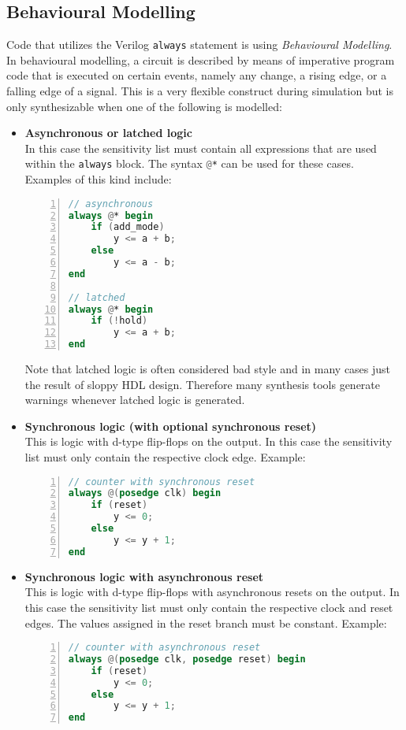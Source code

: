 \subsection{Behavioural Modelling}

Code that utilizes the Verilog {\tt always} statement is using {\it Behavioural
Modelling}. In behavioural modelling, a circuit is described by means of imperative
program code that is executed on certain events, namely any change, a rising
edge, or a falling edge of a signal. This is a very flexible construct during
simulation but is only synthesizable when one of the following is modelled:

\begin{itemize}
\item {\bf Asynchronous or latched logic} \\
In this case the sensitivity list must contain all expressions that are used within
the {\tt always} block. The syntax \lstinline[language=Verilog]{@*} can be used
for these cases. Examples of this kind include:

\begin{lstlisting}[numbers=left,frame=single,language=Verilog]
// asynchronous
always @* begin
	if (add_mode)
		y <= a + b;
	else
		y <= a - b;
end

// latched
always @* begin
	if (!hold)
		y <= a + b;
end
\end{lstlisting}

Note that latched logic is often considered bad style and in many cases just
the result of sloppy HDL design. Therefore many synthesis tools generate warnings
whenever latched logic is generated.

\item {\bf Synchronous logic (with optional synchronous reset)} \\
This is logic with d-type flip-flops on the output. In this case the sensitivity
list must only contain the respective clock edge. Example:
\begin{lstlisting}[numbers=left,frame=single,language=Verilog]
// counter with synchronous reset
always @(posedge clk) begin
	if (reset)
		y <= 0;
	else
		y <= y + 1;
end
\end{lstlisting}

\item {\bf Synchronous logic with asynchronous reset} \\
This is logic with d-type flip-flops with asynchronous resets on the output. In
this case the sensitivity list must only contain the respective clock and reset edges.
The values assigned in the reset branch must be constant. Example:
\begin{lstlisting}[numbers=left,frame=single,language=Verilog]
// counter with asynchronous reset
always @(posedge clk, posedge reset) begin
	if (reset)
		y <= 0;
	else
		y <= y + 1;
end
\end{lstlisting}
\end{itemize}

